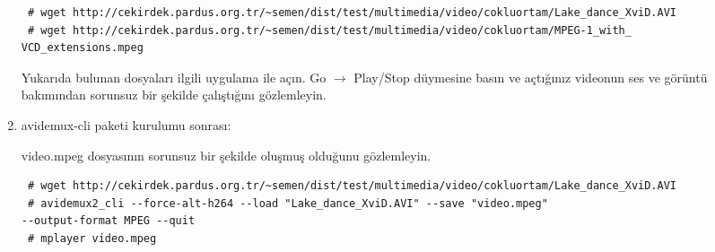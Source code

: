 \documentclass[a4paper,10pt]{article}
\begin{document}
\begin{enumerate}
\begin{verbatim}
 # wget http://cekirdek.pardus.org.tr/~semen/dist/test/multimedia/video/cokluortam/Lake_dance_XviD.AVI
 # wget http://cekirdek.pardus.org.tr/~semen/dist/test/multimedia/video/cokluortam/MPEG-1_with_
VCD_extensions.mpeg
\end{verbatim}
Yukarıda bulunan dosyaları ilgili uygulama ile açın. Go $\rightarrow$ Play/Stop düymesine basın ve açtığınız videonun ses ve görüntü bakımından sorunsuz bir şekilde çalıştığını gözlemleyin.
\item avidemux-cli paketi kurulumu sonrası:

video.mpeg dosyasının sorunsuz bir şekilde oluşmuş olduğunu gözlemleyin.
\begin{verbatim}
 # wget http://cekirdek.pardus.org.tr/~semen/dist/test/multimedia/video/cokluortam/Lake_dance_XviD.AVI
 # avidemux2_cli --force-alt-h264 --load "Lake_dance_XviD.AVI" --save "video.mpeg" 
--output-format MPEG --quit 
 # mplayer video.mpeg
\end{verbatim}

\end{enumerate}
\end{document}
